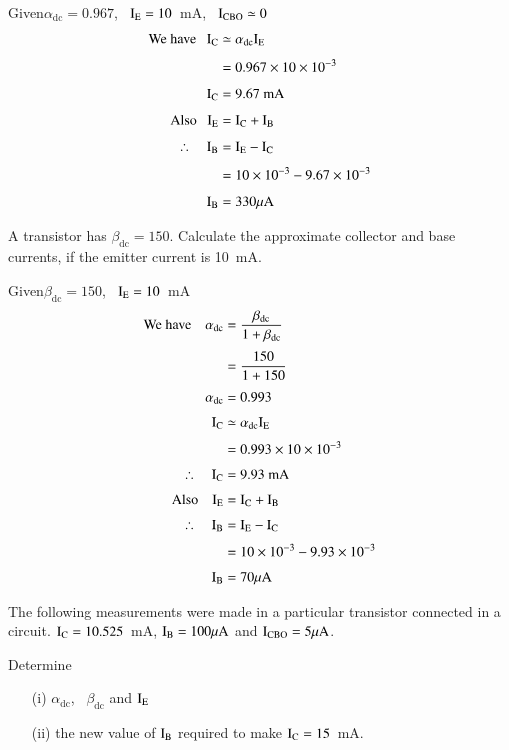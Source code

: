 \begin{solution}
Given\quad $\alpha_{\text{dc}}=0.967$, \ $\textrm{I}_{\textrm{E}}=10$~mA, \ $\textrm{I}_{\text{CBO}}\simeq 0$
\begin{align*}
\text{We have~~ } \textrm{I}_{\textrm{C}} &\simeq \alpha_{\text{dc}}\textrm{I}_{\textrm{E}}\\[4pt]
&= 0.967\times 10\times 10^{-3}\\[4pt]
\textrm{I}_{\textrm{C}} &= 9.67\text{~mA}\\[4pt]
\text{Also~~ } \textrm{I}_{\textrm{E}} &= \textrm{I}_{\textrm{C}}+\textrm{I}_{\textrm{B}}\\[4pt]
\therefore\quad \textrm{I}_{\textrm{B}} &= \textrm{I}_{\textrm{E}}-\textrm{I}_{\textrm{C}}\\[4pt]
&= 10\times 10^{-3}-9.67\times 10^{-3}\\[4pt]
\textrm{I}_{\textrm{B}} &= 330\mu\textrm{A}
\end{align*}
\end{solution}

\eject

\begin{problem}\label{prob2.8}
A transistor has $\beta_{\text{dc}}=150$. Calculate the approximate collector and base currents, if the emitter current is 10~mA.
\end{problem}

\begin{solution}
Given\quad $\beta_{\text{dc}}=150$, \ $\textrm{I}_{\textrm{E}}=10$~mA
\begin{align*}
\text{We have}\quad \alpha_{\text{dc}} &= \dfrac{\beta_{\text{dc}}}{1+\beta_{\text{dc}}}\\[3pt]
&= \frac{150}{1+150}\\[3pt]
\alpha_{\text{dc}} &= 0.993\\[3pt]
\textrm{I}_{\textrm{C}} &\simeq \alpha_{\text{dc}}\textrm{I}_{\textrm{E}}\\[3pt]
&= 0.993\times 10\times 10^{-3}\\[3pt]
\therefore\quad \textrm{I}_{\textrm{C}} &= 9.93\text{~mA}\\[3pt]
\text{Also}\quad \textrm{I}_{\textrm{E}} &= \textrm{I}_{\textrm{C}}+\textrm{I}_{\textrm{B}}\\[3pt]
\therefore\quad \textrm{I}_{\textrm{B}} &= \textrm{I}_{\textrm{E}}-\textrm{I}_{\textrm{C}}\\[3pt]
&= 10\times 10^{-3}-9.93\times 10^{-3}\\[3pt]
\textrm{I}_{\textrm{B}} &= 70\mu\textrm{A}
\end{align*}
\end{solution}

\begin{problem}\label{prob2.9}
The following measurements were made in a particular transistor connected in a circuit. $\textrm{I}_{\textrm{C}}=10.525$~mA, $\textrm{I}_{\textrm{B}}=100\mu\textrm{A}$ and $\textrm{I}_{\text{CBO}}=5\mu\textrm{A}$.

Determine
\begin{itemize}
\item[(i)] $\alpha_{\text{dc}}$, \ $\beta_{\text{dc}}$ and $\textrm{I}_{\textrm{E}}$

\item[(ii)] the new value of $\textrm{I}_{\textrm{B}}$ required to make $\textrm{I}_{\textrm{C}}=15$~mA.
\end{itemize}
\end{problem}

